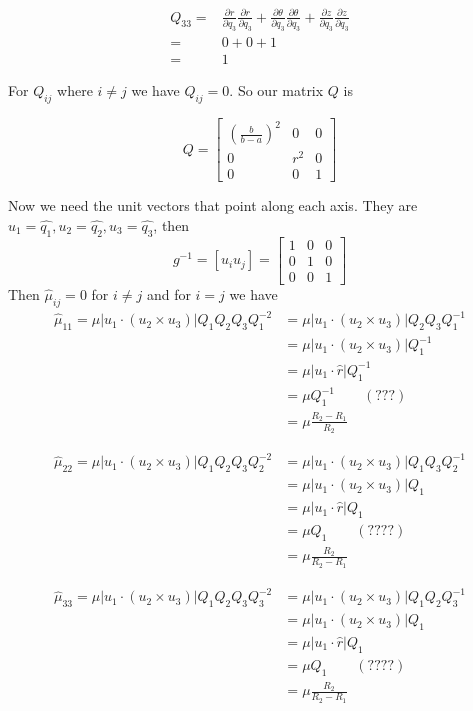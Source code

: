 \documentclass{amsart}
\begin{document}
\begin{align*}
Q_{33}
=&\frac{\partial r}{\partial q_3}\frac{\partial r}{\partial q_3}
+\frac{\partial \theta}{\partial q_3}\frac{\partial \theta}{\partial q_3}
+\frac{\partial z}{\partial q_3}\frac{\partial z}{\partial q_3}\\
=&0+0+1\\
=&1
\end{align*}

For $Q_{ij}$ where $i\neq j$ we have $Q_{ij}=0$. So our matrix $Q$ is

\[
  Q=\begin{bmatrix}
    \left(\frac{b}{b-a}\right)^2 & 0 & 0\\
    0 & r^2 & 0\\
    0 & 0 & 1
  \end{bmatrix}
\]

Now we need the unit vectors that point along each axis. They are $u_1=\widehat{q_1},u_2=\widehat{q_2},u_3=\widehat{q_3}$,
then
\[
  g^{-1}=
  [u_iu_j]=
  \begin{bmatrix}
    1 & 0 & 0\\
    0 & 1 & 0\\
    0 & 0 & 1
  \end{bmatrix}
\]
Then $\hat{\mu}_{ij}=0$ for $i\neq j$ and for $i=j$ we have
\begin{align*}
  \hat{\mu}_{11}=\mu|u_1\cdot(u_2\times u_3)|Q_1Q_2Q_3Q_1^{-2}
  &=\mu|u_1\cdot(u_2\times u_3)|Q_2Q_3Q_1^{-1}\\
  &=\mu|u_1\cdot(u_2\times u_3)|Q_1^{-1}\\
  &=\mu|u_1\cdot\hat{r}|Q_1^{-1}\\
  &=\mu Q_1^{-1}\qquad (???)\\
  &=\mu \frac{R_2-R_1}{R_2}
\end{align*}

\begin{align*}
  \hat{\mu}_{22}=\mu|u_1\cdot(u_2\times u_3)|Q_1Q_2Q_3Q_2^{-2}
  &=\mu|u_1\cdot(u_2\times u_3)|Q_1Q_3Q_2^{-1}\\
  &=\mu|u_1\cdot(u_2\times u_3)|Q_1\\
  &=\mu|u_1\cdot\hat{r}|Q_1\\
  &=\mu Q_1\qquad (????)\\
  &=\mu \frac{R_2}{R_2-R_1}
\end{align*}

\begin{align*}
  \hat{\mu}_{33}=\mu|u_1\cdot(u_2\times u_3)|Q_1Q_2Q_3Q_3^{-2}
  &=\mu|u_1\cdot(u_2\times u_3)|Q_1Q_2Q_3^{-1}\\
  &=\mu|u_1\cdot(u_2\times u_3)|Q_1\\
  &=\mu|u_1\cdot\hat{r}|Q_1\\
  &=\mu Q_1\qquad (????)\\
  &=\mu \frac{R_2}{R_2-R_1}
\end{align*}

\end{document}
